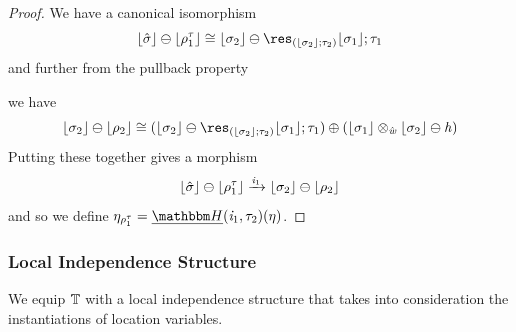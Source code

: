 \begin{proof}
    We have a canonical isomorphism
    \[ \concL{\hat\sigma} \ominus \concL{\rho^\tau_1} \iso \concL{\sigma_2} \ominus \res_{(\concL{\sigma_2}; \tau_2)}\concL{\sigma_1};\tau_1 \]
    and further from the pullback property
    \begin{center}
    \end{center}
    we have 
\[ \concL{\sigma_2} \ominus \concL{\rho_2} \iso (\concL{\sigma_2} \ominus \res_{(\concL{\sigma_2}; \tau_2)}\concL{\sigma_1};\tau_1) \mplus 
                                                (\concL{\sigma_1} \pltimes{\hat\vw} \concL{\sigma_2} \ominus \vh) \]
    Putting these together gives a morphism 
    \[ \lfloor\hat\sigma\rfloor \ominus \lfloor\rho^\tau_1\rfloor \xrightarrow{\mathit{i}_1} \lfloor\sigma_2\rfloor \ominus \lfloor\rho_2\rfloor \]
    and so we define $\mvarM_{\rho^\tau_1} = \dheapF(\incl_1, \tau_2)(\mvarM)$.
\end{proof}

\subsubsection{Local Independence Structure}

We equip $\mathbb{T}$ with a local independence structure that takes into consideration the instantiations of location variables.


